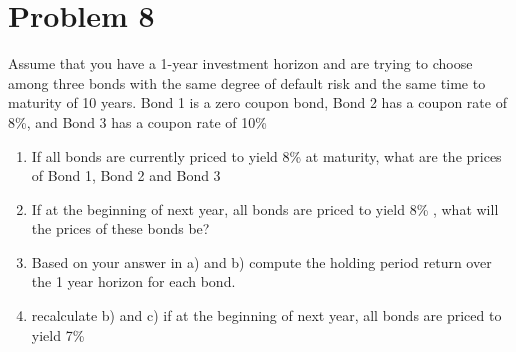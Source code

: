 \documentclass[12]{article}
\begin{document}
\color{black}
\section*{Problem 8}
Assume that you have a 1-year investment horizon and are trying to choose among three bonds with the same degree of default risk and the same time to maturity of 10 years. Bond 1 is a zero coupon bond, Bond 2 has a coupon rate of 8\%, and Bond 3 has a coupon rate of 10\%
\begin{enumerate}
    \item[a)] If all bonds are currently priced to yield 8\% at maturity, what are the prices of Bond 1, Bond 2 and Bond 3
    \item[b)] If at the beginning of next year, all bonds are priced to yield 8\% , what will the prices of these bonds be?
    \item[c)] Based on your answer in a) and b) compute the holding period return over the 1 year horizon for each bond. 
    \item[d)] recalculate b) and c) if at the beginning of next year, all bonds are priced to yield 7\%
\end{enumerate}
\end{document}
